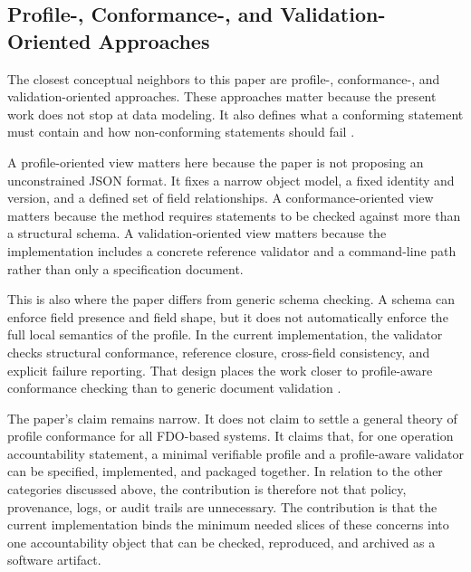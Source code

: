 \subsection{Profile-, Conformance-, and Validation-Oriented Approaches}

The closest conceptual neighbors to this paper are profile-, conformance-, and validation-oriented approaches. These approaches matter because the present work does not stop at data modeling. It also defines what a conforming statement must contain and how non-conforming statements should fail \cite{atkinson2019profiles,knublauch2017shacl,wright2022jsonschemavalidation}.

A profile-oriented view matters here because the paper is not proposing an unconstrained JSON format. It fixes a narrow object model, a fixed identity and version, and a defined set of field relationships. A conformance-oriented view matters because the method requires statements to be checked against more than a structural schema. A validation-oriented view matters because the implementation includes a concrete reference validator and a command-line path rather than only a specification document.

This is also where the paper differs from generic schema checking. A schema can enforce field presence and field shape, but it does not automatically enforce the full local semantics of the profile. In the current implementation, the validator checks structural conformance, reference closure, cross-field consistency, and explicit failure reporting. That design places the work closer to profile-aware conformance checking than to generic document validation \cite{wright2022jsonschema,wright2022jsonschemavalidation}.

The paper's claim remains narrow. It does not claim to settle a general theory of profile conformance for all FDO-based systems. It claims that, for one operation accountability statement, a minimal verifiable profile and a profile-aware validator can be specified, implemented, and packaged together. In relation to the other categories discussed above, the contribution is therefore not that policy, provenance, logs, or audit trails are unnecessary. The contribution is that the current implementation binds the minimum needed slices of these concerns into one accountability object that can be checked, reproduced, and archived as a software artifact.
